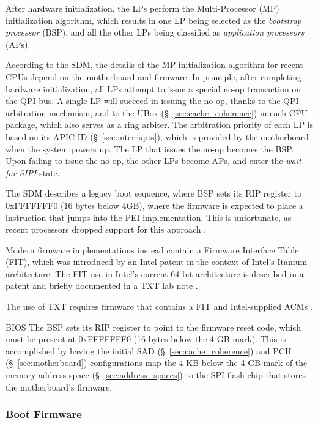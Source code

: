 After hardware initialization, the LPs perform the Multi-Processor (MP)
initialization algorithm, which results in one LP being selected as the
\textit{bootstrap processor} (BSP), and all the other LPs being classified as
\textit{application processors} (APs).

According to the SDM, the details of the MP initialization algorithm for recent
CPUs depend on the motherboard and firmware. In principle, after completing
hardware initialization, all LPs attempt to issue a special no-op transaction
on the QPI bus. A single LP will succeed in issuing the no-op, thanks to
the QPI arbitration mechanism, and to the UBox (\S~\ref{sec:cache_coherence})
in each CPU package, which also serves as a ring arbiter. The arbitration
priority of each LP is based on its APIC ID (\S~\ref{sec:interrupts}), which is
provided by the motherboard when the system powers up. The LP that issues the
no-op becomes the BSP. Upon failing to issue the no-op, the other LPs become
APs, and enter the \textit{wait-for-SIPI} state.


The SDM describes a legacy boot sequence, where BSP sets its RIP register to
0xFFFFFFF0 (16 bytes below 4GB), where the firmware is expected to place a
instruction that jumps into the PEI implementation. This is unfortunate, as
recent processors dropped support for this approach
\cite{reinauer2013fitpatch}.

Modern firmware implementations instead contain a Firmware Interface Table
(FIT), which was introduced by an Intel patent \cite{qureshi2006fit} in the
context of Intel's Itanium architecture. The FIT use in Intel's current 64-bit
architecture is described in a patent \cite{datta2013acm} and briefly
documented in a TXT lab note \cite{intel2010txtlab}.

The use of TXT requires firmware that contains a FIT and Intel-supplied ACMs
\cite[p. 92]{futral2013servertxt}.


BIOS
The BSP sets its RIP register to point to the firmware reset code, which must
be present at 0xFFFFFFF0 (16 bytes below the 4 GB mark). This is accomplished
by having the initial SAD (\S~\ref{sec:cache_coherence}) and PCH
(\S~\ref{sec:motherboard}) configurations map the 4 KB below the 4 GB mark of
the memory address space (\S~\ref{sec:address_spaces}) to the SPI flash chip
that stores the motherboard's firmware.

\subsubsection{Boot Firmware}
\label{sec:firmware_boot}

